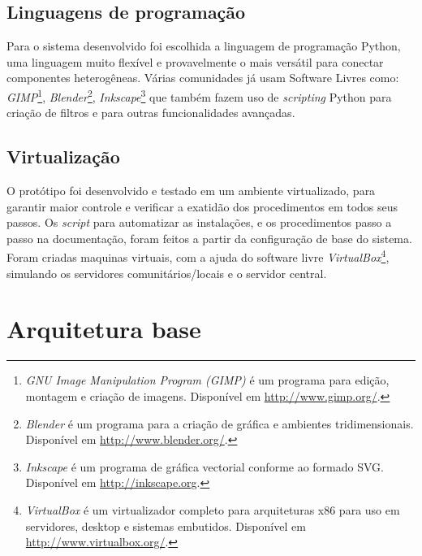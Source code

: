 \subsection{Linguagens de programação}
Para o sistema desenvolvido foi escolhida a linguagem de programação
Python, uma linguagem muito flexível e provavelmente o mais versátil
para conectar componentes heterogêneas. Várias comunidades já usam
Software Livres como: \emph{GIMP}\footnote{\emph{GNU Image
    Manipulation Program (GIMP)} é um programa para edição, montagem e
  criação de imagens. Disponível em \url{http://www.gimp.org/}.},
\emph{Blender}\footnote{\emph{Blender} é um programa para a criação de
  gráfica e ambientes tridimensionais. Disponível em
  \url{http://www.blender.org/}.},
\emph{Inkscape}\footnote{\emph{Inkscape} é um programa de gráfica
  vectorial conforme ao formado SVG. Disponível em
  \url{http://inkscape.org}.} que também fazem uso de \emph{scripting}
Python para criação de filtros e para outras funcionalidades
avançadas.

\subsection{Virtualização}
O protótipo foi desenvolvido e testado em um ambiente virtualizado,
para garantir maior controle e verificar a exatidão dos procedimentos
em todos seus passos. Os \emph{script} para automatizar as
instalações, e os procedimentos passo a passo na documentação, foram
feitos a partir da configuração de base do sistema. Foram criadas
maquinas virtuais, com a ajuda do software livre
\emph{VirtualBox}\footnote{\emph{VirtualBox} é um virtualizador
  completo para arquiteturas x86 para uso em servidores, desktop e
  sistemas embutidos. Disponível em
  \url{http://www.virtualbox.org/}.}, simulando os servidores
comunitários/locais e o servidor central.

\section{Arquitetura base}

